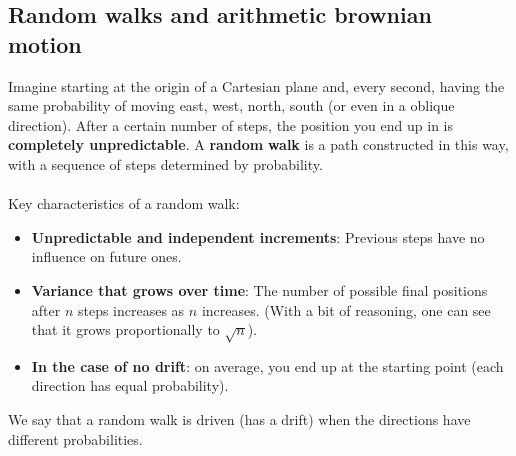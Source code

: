 \subsection{Random walks and arithmetic brownian motion}
Imagine starting at the origin of a Cartesian plane and, every second, having the same probability of moving east, west, north, south (or even in a oblique direction). After a certain number of steps, the position you end up in is \textbf{completely unpredictable}. A \textbf{random} \textbf{walk} is a path constructed in this way, with a sequence of steps determined by probability. \\
\\
Key characteristics of a random walk:
\begin{itemize}
    \item \textbf{Unpredictable and independent increments}: Previous steps have no influence on future ones.
    \item \textbf{Variance that grows over time}: The number of possible final positions after $n$ steps increases as $n$ increases. (With a bit of reasoning, one can see that it grows proportionally to $\sqrt{n}$).
    \item \textbf{In the case of no drift}: on average, you end up at the starting point (each direction has equal probability).
\end{itemize}
We say that a random walk is driven (has a drift) when the directions have different probabilities.


